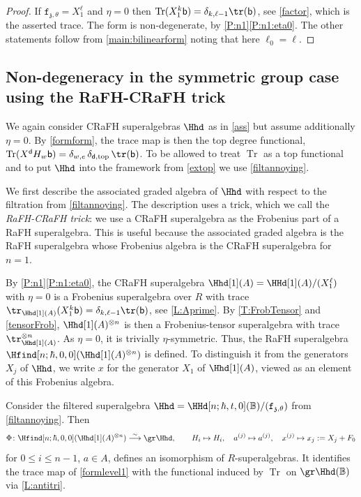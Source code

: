 \documentclass[a4paper,11pt]{amsart}
\newcommand\bijection[1][\sim]{\overset{#1}{\longrightarrow}}
\newcommand{\Tr}{\op{Tr}}
\numberwithin{equation}{subsection}
\theoremstyle{definition}
\theoremstyle{theorem}
\theoremstyle{remark}
\newcommand\charge{{\mathfrak{z}}}
\newcommand\fct{\mathtt{f}_{\charge,\theta}}
\newcommand\ELL{\text{\scriptsize top}}%
\newcommand\bd{\mathsf{d}}
\newcommand\bb{\mathsf{b}}
\newcommand\op{\operatorname}
\newcommand{\Bo}{\mathbb{B}}
\begin{document}
\begin{proof}
  If $\fct=X_1^{\ell}$ and $\eta=0$ then
  $\Tr(X_1^{k}\bb)=\delta_{k,\ell-1}\tr(\bb)$, see \autoref{factor}, which is the asserted trace. The form is  non-degenerate, by \autoref{P:n1}\autoref{P:n1:eta0}. The other statements follow from \autoref{main:bilinearform} noting that here $\ell_0=\ell$.
\end{proof}

\subsection{Non-degeneracy in the  symmetric group case using the RaFH-CRaFH trick}
\label{SS:Trick}
We again consider CRaFH superalgebras $\Hhd$ as in  \autoref{ass}  but
assume additionally $\eta=0$. By \autoref{formform}, the trace map is
then the top degree functional, $\Tr(X^\bd
H_w\bb)=\delta_{w,e}\,\delta_{\bd,\ELL}\,\tr(\bb)$. To be allowed to treat $\Tr$ as
a top functional and to put $\Hhd$ into the framework from
\autoref{extop} we use \autoref{filtannoying}.

We first describe the associated graded algebra of $\Hhd$ with respect
to the filtration from \autoref{filtannoying}. The description uses a
trick, which we call the \emph{RaFH-CRaFH trick}: we use a CRaFH
superalgebra as the Frobenius part of a RaFH superalgebra. This is
useful because the associated graded algebra is the RaFH superalgebra whose Frobenius algebra is the CRaFH superalgebra for $n=1$.

By \autoref{P:n1}\autoref{P:n1:eta0}, the CRaFH superalgebra $\Hhd[1](A)=\HHd[1](A)/(X_1^{\ell})$ with $\eta=0$ is a Frobenius superalgebra over $R$ with trace $\tr_{\Hhd[1](A)}(X_1^k\bb)=\delta_{k,\ell-1}\tr(\bb)$, see \autoref{L:Aprime}. By \autoref{T:FrobTensor} and \autoref{tensorFrob}, $\Hhd[1](A)^{\otimes n}$ is then a Frobenius-tensor superalgebra with trace $\tr_{\Hhd[1](A)}^{\otimes n}$. As $\eta=0$, it is trivially $\eta$-symmetric. Thus,  the RaFH superalgebra $\Hfind[n;\hbar,0,0](\Hhd[1](A)^{\otimes n})$ is defined. To distinguish it from the generators $X_j$ of $\Hhd$, we write $x$ for the generator $X_1$ of $\Hhd[1](A)$, viewed as an element of this Frobenius algebra.


\begin{Proposition}\label{L:gr}Consider the filtered superalgebra $\Hhd=\HHd[n;\hbar, t, 0](\Bo)/(\fct)$ from \autoref{filtannoying}. Then
  \[
   \Phi\colon \Hfind[n;\hbar,0,0](\Hhd[1](A)^{\otimes n})\bijection\gr\Hhd,\qquad
    H_i\mapsto H_i,\quad a^{(j)}\mapsto a^{(j)},\quad x^{(j)}\mapsto x_j:=X_j+F_0
  \]
  for $0\leq i\leq n-1$, $a\in A$,
  defines an isomorphism of $R$-superalgebras. It identifies the trace map of
  \autoref{formlevel1} with the functional induced by $\Tr$ on $\gr\Hhd(\Bo)$ via \autoref{L:antitri}.
\end{Proposition}
\end{document}
